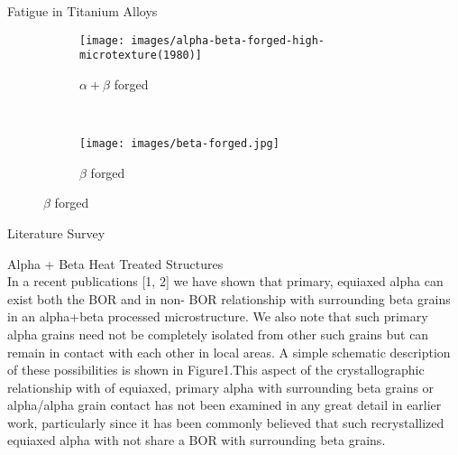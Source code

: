 \documentclass[10pt]{beamer}
\begin{document}
{%
\begin{frame}[fragile]{Fatigue in Titanium Alloys}

\begin{figure}[H]
    \centering
    \begin{subfigure}{0.40\textwidth}
        \texttt{[image: images/alpha-beta-forged-high-microtexture(1980)]}
        \caption{\tiny  $\alpha+\beta$ forged}
        \label{fig:Ti-6242 Surface}
    \end{subfigure}
    ~
    \begin{subfigure}{0.40\textwidth}
        \texttt{[image: images/beta-forged.jpg]}
        \caption{\tiny $\beta$ forged}
        \label{fig:Ti-6242 Surface}
    \end{subfigure}        
  
    
\end{figure}

\end{frame}
}

{%
\begin{frame}[fragile]{Literature Survey}

Alpha + Beta Heat Treated Structures \\
In a recent publications [1, 2] we have shown that primary, equiaxed alpha can exist both the BOR and in non- BOR relationship with surrounding beta grains in an alpha+beta processed microstructure. We also note that such primary alpha grains need not be completely isolated from other such grains but can remain in contact with each other in local areas. A simple schematic description of these possibilities is shown in Figure1.This aspect of the crystallographic relationship with of equiaxed, primary alpha with surrounding beta grains or alpha/alpha grain contact has not been examined in any great detail in earlier work, particularly since it has been commonly believed that such recrystallized equiaxed alpha with not share a BOR with surrounding beta grains.

\end{frame}
}
\end{document}
